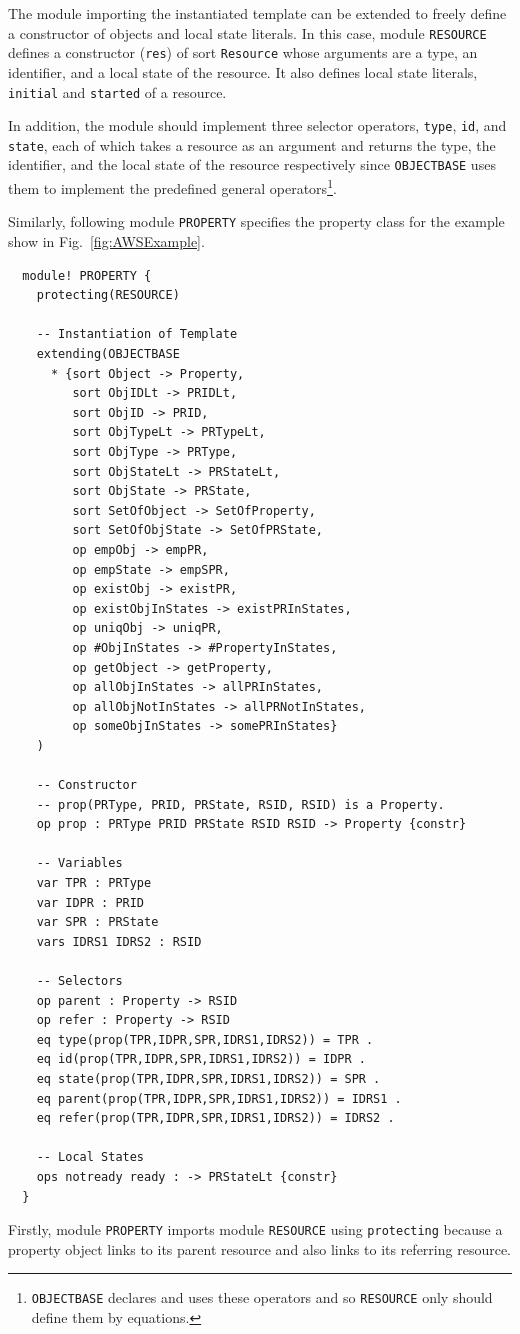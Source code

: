 \documentclass[12pt]{report}
\begin{document}
The module importing the instantiated template can be extended to
freely define a constructor of objects and local state literals.  In
this case, module {\tt RESOURCE} defines a constructor ({\tt res}) of
sort {\tt Resource} whose arguments are a type, an identifier, and a
local state of the resource. It also defines local state literals,
{\tt initial} and {\tt started} of a resource.

In addition, the module should implement three selector operators,
{\tt type}, {\tt id}, and {\tt state}, each of which takes a resource
as an argument and returns the type, the identifier, and the local
state of the resource respectively since {\tt OBJECTBASE} uses them to
implement the predefined general operators\footnote{{\tt OBJECTBASE}
  declares and uses these operators and so {\tt RESOURCE} only should
  define them by equations.}.

Similarly, following module {\tt PROPERTY} specifies the property class 
for the example show in Fig.~\ref{fig:AWSExample}.
\begin{verbatim}
  module! PROPERTY {
    protecting(RESOURCE)
  
    -- Instantiation of Template
    extending(OBJECTBASE
      * {sort Object -> Property,
         sort ObjIDLt -> PRIDLt,
         sort ObjID -> PRID,
         sort ObjTypeLt -> PRTypeLt,
         sort ObjType -> PRType,
         sort ObjStateLt -> PRStateLt,
         sort ObjState -> PRState,
         sort SetOfObject -> SetOfProperty,
         sort SetOfObjState -> SetOfPRState,
         op empObj -> empPR,
         op empState -> empSPR,
         op existObj -> existPR,
         op existObjInStates -> existPRInStates,
         op uniqObj -> uniqPR,
         op #ObjInStates -> #PropertyInStates,
         op getObject -> getProperty,
         op allObjInStates -> allPRInStates,
         op allObjNotInStates -> allPRNotInStates,
         op someObjInStates -> somePRInStates}
    )
  
    -- Constructor
    -- prop(PRType, PRID, PRState, RSID, RSID) is a Property.
    op prop : PRType PRID PRState RSID RSID -> Property {constr}
  
    -- Variables
    var TPR : PRType
    var IDPR : PRID
    var SPR : PRState
    vars IDRS1 IDRS2 : RSID
  
    -- Selectors
    op parent : Property -> RSID
    op refer : Property -> RSID
    eq type(prop(TPR,IDPR,SPR,IDRS1,IDRS2)) = TPR .
    eq id(prop(TPR,IDPR,SPR,IDRS1,IDRS2)) = IDPR .
    eq state(prop(TPR,IDPR,SPR,IDRS1,IDRS2)) = SPR .
    eq parent(prop(TPR,IDPR,SPR,IDRS1,IDRS2)) = IDRS1 .
    eq refer(prop(TPR,IDPR,SPR,IDRS1,IDRS2)) = IDRS2 .
  
    -- Local States
    ops notready ready : -> PRStateLt {constr}
  }
\end{verbatim}
Firstly, module {\tt PROPERTY} imports module {\tt RESOURCE} using
{\tt protecting} because a property object links to its parent
resource and also links to its referring resource.
\end{document}
